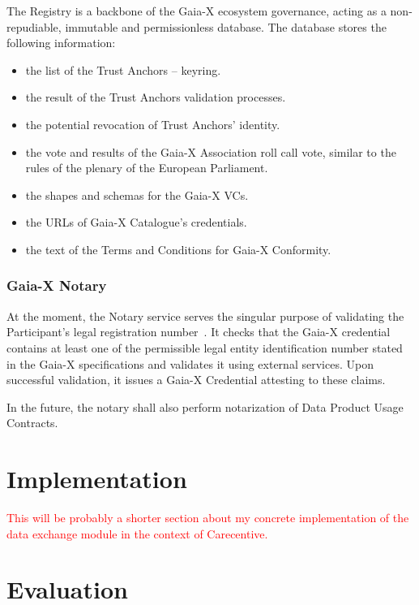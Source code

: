 The Registry is a backbone of the Gaia-X ecosystem governance, acting as a non-repudiable, immutable and permissionless database\cite{gaiax_trust_framework}.
The database stores the following information:
\begin{itemize}
    \item the list of the Trust Anchors – keyring.
    \item the result of the Trust Anchors validation processes.
    \item the potential revocation of Trust Anchors' identity.
    \item the vote and results of the Gaia-X Association roll call vote, similar to the rules of the plenary of the European Parliament.
    \item the shapes and schemas for the Gaia-X VCs.
    \item the URLs of Gaia-X Catalogue’s credentials.
    \item the text of the Terms and Conditions for Gaia-X Conformity.
\end{itemize}

\subsubsection{Gaia-X Notary}

At the moment, the Notary service serves the singular purpose of validating the Participant's legal registration number~\cite{gaiax_trust_framework}.
It checks that the Gaia-X credential contains at least one of the permissible legal entity identification number stated in the Gaia-X specifications and validates it using external services.
Upon successful validation, it issues a Gaia-X Credential attesting to these claims.

In the future, the notary shall also perform notarization of Data Product Usage Contracts. %

\section{Implementation}\label{sec:implementation}

\textcolor{red}{This will be probably a shorter section about my concrete implementation of the data exchange module in the context of Carecentive.}

\section{Evaluation}\label{sec:evaluation}

